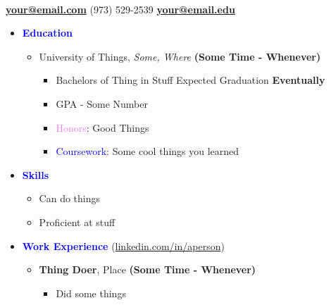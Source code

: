 \documentclass[11pt]{article}
\begin{document}
\begin{flushleft}

    \makebox[\textwidth]{\LARGE \textbf{\textcolor{teal}{Your Name}}}\\

\setlength{\parindent}{0.5in}

\begin{multicols}{2}
    \textbf{\href{mailto:your@email.com}{your@email.com}} \textemdash{} (973) 529-2539
    \textbf{\href{mailto:your@email.edu}{your@email.edu}}
\end{multicols}

\begin{itemize}
    \item[] \Large \textcolor{blue}{\textbf{Education}} \normalsize
        \begin{itemize}
            \item University of Things, \textit{Some, Where}  \hfill{\textbf{(Some Time - Whenever)}}
                \begin{itemize}
                    \item Bachelors of Thing in Stuff \hfill{Expected Graduation \textbf{Eventually}}
                    \item GPA - Some Number
                    \item \textcolor{violet}{Honors}: Good Things
                    \item \textcolor{blue}{Coursework}: Some cool things you learned
                \end{itemize}
        \end{itemize}
    \item[] \Large \textcolor{blue}{\textbf{Skills}} \normalsize
        \begin{itemize}
            \item Can do things
            \item Proficient at stuff
        \end{itemize}
    \item[] \Large \textcolor{blue}{\textbf{Work Experience}} (\href{https://linkedin.com/in/aperson}{linkedin.com/in/aperson}) \normalsize
        \begin{itemize}
            \item \textbf{Thing Doer}, Place \hfill{\textbf{(Some Time - Whenever)}}
                \begin{itemize}
                    \item Did some things
                \end{itemize}

\end{itemize}
\end{itemize}
\end{flushleft}
\end{document}
